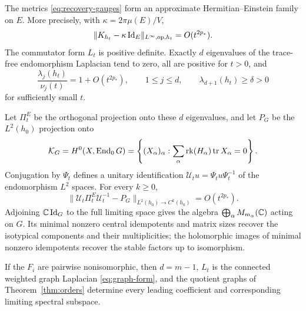 \begin{theorem}\label{thm:curve-recovery}
The metrics \eqref{eq:recovery-gauges} form an approximate
Hermitian--Einstein family on $E$. More precisely, with
$\kappa=2\pi\mu(E)/V$,
\begin{equation}\label{eq:recovery-curvature}
 \lVert K_{h_t}-\kappa\operatorname{Id}_E\rVert_{L^\infty,\mathrm{op},h_t}
 =O(t^{2p_*}).
\end{equation}
The commutator form $L_t$ is positive definite. Exactly $d$ eigenvalues of the
trace-free endomorphism Laplacian tend to zero, all are positive for
$t>0$, and
\begin{equation}\label{eq:recovery-rates}
 \frac{\lambda_j(h_t)}{\nu_j(t)}=1+O(t^{2p_*}),
 \qquad 1\le j\le d,\qquad
 \lambda_{d+1}(h_t)\ge\delta>0
\end{equation}
for sufficiently small $t$.

Let $\Pi_t^E$ be the orthogonal projection onto these $d$
eigenvalues, and let $P_G$ be the $L^2(h_0)$ projection onto
\[
 \mathcal K_G=H^0(X,\operatorname{End}_0G)
 =\left\{(X_\alpha)_\alpha:\sum_\alpha
       \operatorname{rk}(H_\alpha)\operatorname{tr} X_\alpha=0\right\}.
\]
Conjugation by $\Psi_t$ defines a unitary identification
$\mathcal U_tu=\Psi_tu\Psi_t^{-1}$ of the endomorphism $L^2$
spaces. For every $k\ge0$,
\begin{equation}\label{eq:recovery-projection}
 \lVert\mathcal U_t\Pi_t^E\mathcal U_t^{-1}-P_G
 \rVert_{L^2(h_0)\to C^k(h_0)}=O(t^{2p_*}).
\end{equation}
Adjoining $\mathbb C\operatorname{Id}_G$ to the full limiting space gives the algebra
$\bigoplus_\alpha M_{m_\alpha}(\mathbb C)$ acting on $G$. Its minimal
nonzero central idempotents and matrix sizes recover the isotypical components and
their multiplicities; the holomorphic images of minimal nonzero
idempotents recover the stable factors up to isomorphism.

If the $F_i$ are pairwise nonisomorphic, then $d=m-1$, $L_t$ is the
connected weighted graph Laplacian \eqref{eq:graph-form}, and the
quotient graphs of Theorem~\ref{thm:orders} determine every leading
coefficient and corresponding limiting spectral subspace.
\end{theorem}

